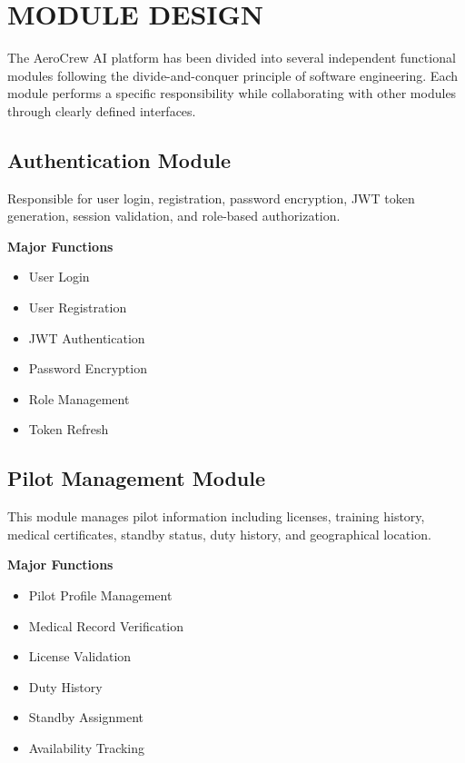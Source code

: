 \documentclass[12pt,a4paper]{report}
\begin{document}
\section{MODULE DESIGN}

The AeroCrew AI platform has been divided into several independent functional modules following the divide-and-conquer principle of software engineering. Each module performs a specific responsibility while collaborating with other modules through clearly defined interfaces.

\subsection{Authentication Module}

Responsible for user login, registration, password encryption, JWT token generation, session validation, and role-based authorization.

\textbf{Major Functions}

\begin{itemize}

\item User Login

\item User Registration

\item JWT Authentication

\item Password Encryption

\item Role Management

\item Token Refresh

\end{itemize}

\subsection{Pilot Management Module}

This module manages pilot information including licenses, training history, medical certificates, standby status, duty history, and geographical location.

\textbf{Major Functions}

\begin{itemize}

\item Pilot Profile Management

\item Medical Record Verification

\item License Validation

\item Duty History

\item Standby Assignment

\item Availability Tracking

\end{itemize}
\end{document}
